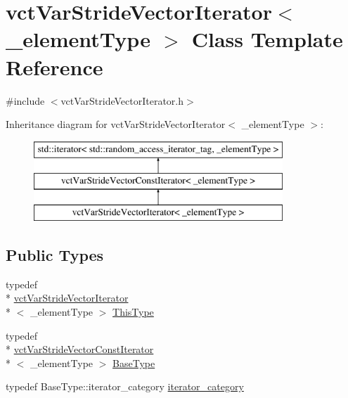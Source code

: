 \hypertarget{classvct_var_stride_vector_iterator}{\section{vct\-Var\-Stride\-Vector\-Iterator$<$ \-\_\-element\-Type $>$ Class Template Reference}
\label{classvct_var_stride_vector_iterator}
}


{\ttfamily \#include $<$vct\-Var\-Stride\-Vector\-Iterator.\-h$>$}

Inheritance diagram for vct\-Var\-Stride\-Vector\-Iterator$<$ \-\_\-element\-Type $>$\-:\begin{figure}[H]
\begin{center}
\leavevmode
\includegraphics[height=3.000000cm]{d0/d39/classvct_var_stride_vector_iterator}
\end{center}
\end{figure}
\subsection*{Public Types}
\begin{DoxyCompactItemize}
\item 
typedef \\*
\hyperlink{classvct_var_stride_vector_iterator}{vct\-Var\-Stride\-Vector\-Iterator}\\*
$<$ \-\_\-element\-Type $>$ \hyperlink{classvct_var_stride_vector_iterator_a9c3effbe4fa874856b5b295a5fec25be}{This\-Type}
\item 
typedef \\*
\hyperlink{classvct_var_stride_vector_const_iterator}{vct\-Var\-Stride\-Vector\-Const\-Iterator}\\*
$<$ \-\_\-element\-Type $>$ \hyperlink{classvct_var_stride_vector_iterator_a4d9d314c1190fa1e730dce082ac1010f}{Base\-Type}
\item 
typedef Base\-Type\-::iterator\-\_\-category \hyperlink{classvct_var_stride_vector_iterator_a17ad751139c29df7d21eb9c05e2f391b}{iterator\-\_\-category}
\end{DoxyCompactItemize}
